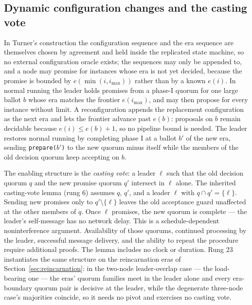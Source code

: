 \documentclass[10pt,journal,letterpaper]{IEEEtran}
\newcommand{\code}[1]{\texttt{\small #1}}
\begin{document}
\subsection{Dynamic configuration changes and the casting vote}
In Turner's construction the configuration sequence and the era sequence are
themselves chosen by agreement and held inside the replicated state machine,
so no external configuration oracle exists; the sequences may only be
appended to, and a node may promise for instances whose era is not yet
decided, because the promise is bounded by $e(\min(i,i_{\max}))$ rather than
by a known $e(i)$. In normal running the leader holds promises from a
phase-I quorum for one large ballot $b$ whose era matches the frontier
$e(i_{\max})$, and may then propose for every instance without limit. A
reconfiguration appends the replacement configuration as the next era and
lets the frontier advance past $e(b)$: proposals on $b$ remain decidable
because $e(i)\le e(b)+1$, so no pipeline bound is needed. The leader
restores normal running by completing phase I at a ballot $b'$ of the new
era, sending \code{prepare($b'$)} to the new quorum minus itself while the
members of the old decision quorum keep accepting on $b$.

The enabling structure is the \emph{casting vote}: a leader $\ell$ such that
the old decision quorum $q$ and the new promise quorum $q'$ intersect in
$\ell$ alone. The inherited casting-vote lemma (rung 6) assumes $q$, $q'$,
and a leader $\ell$ with $q\cap q'=\{\ell\}$. Sending new promises only to
$q'\setminus\{\ell\}$ leaves the old acceptance guard unaffected at the other
members of $q$. Once $\ell$ promises, the new quorum is complete --- the
leader's self-message has no network delay. This is a schedule-dependent
noninterference argument. Availability of those quorums, continued processing
by the leader, successful message delivery, and the ability to repeat the
procedure require additional proofs. The lemma includes no clock or duration.
Rung 23 instantiates the same structure on the reincarnation eras of
Section~\ref{sec:reincarnation}: in the two-node leader-overlap case --- the
load-bearing one --- the eras' quorum families meet in the leader alone and
every era-boundary quorum pair is decisive at the leader, while the degenerate
three-node case's majorities coincide, so it needs no pivot and exercises no
casting vote.
\end{document}
